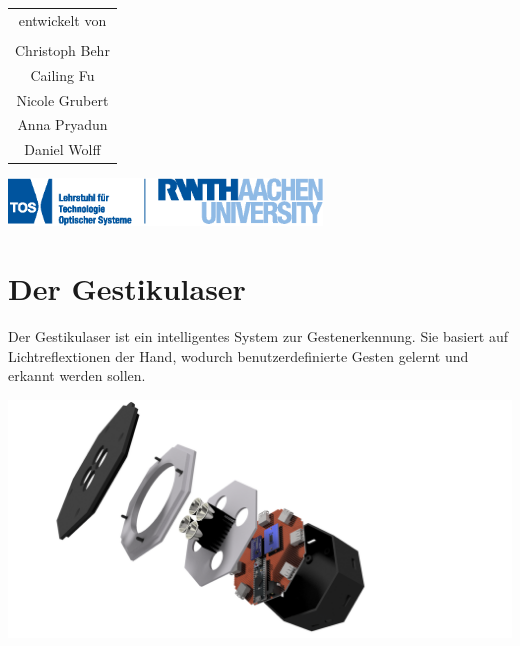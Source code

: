 \documentclass[a4paper,12pt,notumble]{leaflet}
\begin{document}
\begin{center}
\begin{tabular}{c}
	entwickelt von \\ \\
	Christoph Behr \\
	Cailing Fu \\
	Nicole Grubert \\
	Anna Pryadun \\
	Daniel Wolff
\end{tabular}

\vfill

\includegraphics[height=1.25cm]{../Logos/TOS.eps}

\end{center}

\newpage
\raggedright



\noindent
\begin{minipage}[c][0.45\textheight][t]{\textwidth}
	\section{Der Gestikulaser}

	Der Gestikulaser ist ein intelligentes System zur Gestenerkennung. Sie basiert auf Lichtreflextionen der Hand, wodurch benutzerdefinierte Gesten gelernt und
	erkannt werden sollen. 

		\centering
		\includegraphics[scale=0.3]{../CAD_Bilder/Oktokommander_raytraced.png}
\end{minipage}
\end{document}
